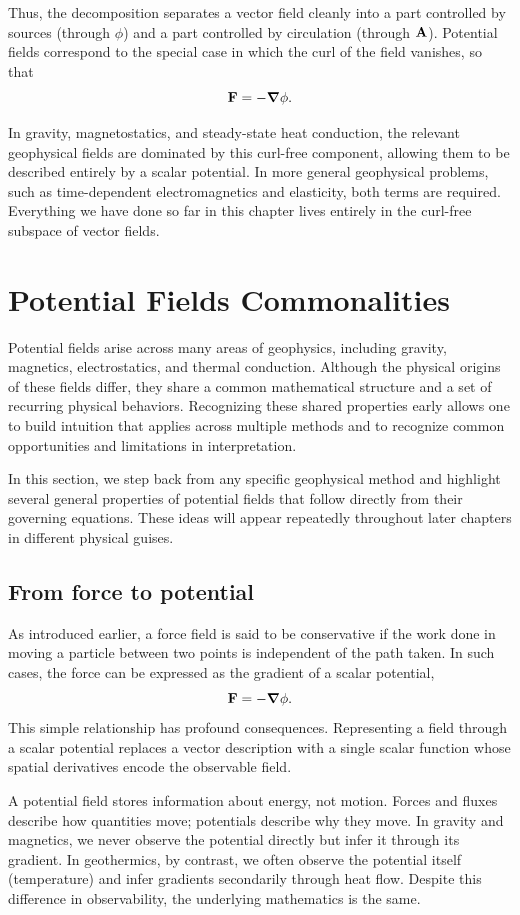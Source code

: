 Thus, the decomposition separates a vector field cleanly into a part controlled
by sources (through $\phi$) and a part controlled by circulation (through
$\vb{A}$). Potential fields correspond to the special case in which the curl of
the field vanishes, so that
\[
    \vb{F} = -\grad \phi.
\]

In gravity, magnetostatics, and steady-state heat conduction, the relevant
geophysical fields are dominated by this curl-free component, allowing them to
be described entirely by a scalar potential. In more general geophysical
problems, such as time-dependent electromagnetics and elasticity, both terms are
required.  Everything we have done so far in this chapter lives entirely in the curl-free
subspace of vector fields.


\section{Potential Fields Commonalities}

Potential fields arise across many areas of geophysics, including gravity, magnetics, electrostatics, and thermal conduction. Although the physical origins of these fields differ, they share a common mathematical structure and a set of recurring physical behaviors. Recognizing these shared properties early allows one to build intuition that applies across multiple methods and to recognize common opportunities and limitations in interpretation.

In this section, we step back from any specific geophysical method and highlight several general properties of potential fields that follow directly from their governing equations. These ideas will appear repeatedly throughout later chapters in different physical guises.

\subsection{From force to potential}
As introduced earlier, a force field is said to be conservative if the work done in moving a particle between two points is independent of the path taken. In such cases, the force can be expressed as the gradient of a scalar potential,
\[
    \vb{F} = -\grad \phi.
\]
This simple relationship has profound consequences. Representing a field through a scalar potential replaces a vector description with a single scalar function whose spatial derivatives encode the observable field.

A potential field stores information about energy, not motion. Forces and fluxes describe how quantities move; potentials describe why they move.  In gravity and magnetics, we never observe the potential directly but infer it through its gradient. In geothermics, by contrast, we often observe the potential itself (temperature) and infer gradients secondarily through heat flow. Despite this difference in observability, the underlying mathematics is the same.

